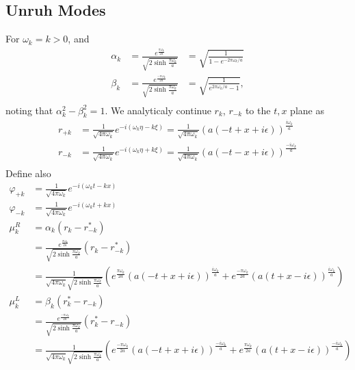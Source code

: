 \documentclass[12pt,a4paper]{article}
\begin{document}
\subsection{Unruh Modes}
For $\omega_k = k > 0$, and
\begin{equation}
  \begin{array}{lll}
    \alpha_k &= \frac{e^{\frac{\pi\omega_k}{2a}}}{\sqrt{2 \sinh \frac{\pi \omega_k}{a}}} &= \sqrt{\frac{1}{1 - e^{-2\pi\omega_k / a}}} \\
    \beta_k &= \frac{e^{\frac{-\pi\omega_k}{2a}}}{\sqrt{2 \sinh \frac{\pi \omega_k}{a}}} &= \sqrt{\frac{1}{e^{2\pi\omega_k / a} - 1}}, \\
  \end{array}
  \label{alpha_beta}
\end{equation}
noting that $\alpha_k^2 - \beta_k^2 = 1$. We analyticaly continue $r_k$, $r_{-k}$ to the $t,x$ plane as
\begin{equation}
  \begin{array}{ll}
    r_{+k} &= \frac{1}{\sqrt{4 \pi \omega_k}} e^{-i(\omega_k \eta - k \xi)} = \frac{1}{\sqrt{4 \pi \omega_k}} (a(-t + x + i \epsilon))^{\frac{i \omega_k}{a}} \\
    r_{-k} &= \frac{1}{\sqrt{4 \pi \omega_k}} e^{-i(\omega_k \eta + k \xi)} = \frac{1}{\sqrt{4 \pi \omega_k}} (a(-t - x + i \epsilon))^{\frac{-i \omega_k}{a}} \\
  \end{array}
\end{equation}
Define also
\begin{equation}
  \begin{array}{ll}
    \varphi_{+k} &= \frac{1}{\sqrt{4 \pi \omega_k}} e^{-i(\omega_k t - k x)}\\
    \varphi_{-k} &= \frac{1}{\sqrt{4 \pi \omega_k}} e^{-i(\omega_k t + k x)}\\
    \mu^R_k &= \alpha_k (r_k - r_{-k}^*) \\
    &= \frac{e^{\frac{\pi \omega_k}{2a}}}{\sqrt{2 \sinh \frac{\pi \omega_k}{a}}} \left(r_k - r_{-k}^* \right) \\
    &= \frac{1}{\sqrt{4 \pi \omega_k}\sqrt{2 \sinh \frac{\pi \omega_k}{a}}} \left( e^{\frac{\pi \omega_k}{2a}} \left(a(-t+x+i\epsilon)\right)^{\frac{i\omega_k}{a}} + e^{\frac{-\pi \omega_k}{2a}} \left(a(t+x-i\epsilon)\right)^{\frac{i\omega_k}{a}} \right) \\
    \mu^L_k &= \beta_k (r_k^* - r_{-k} )\\
    &=\frac{e^{\frac{-\pi \omega_k}{2a}}}{\sqrt{2 \sinh \frac{\pi \omega_k}{a}}} \left(r_k^* - r_{-k} \right) \\
    &=\frac{1}{\sqrt{4 \pi \omega_k}\sqrt{2 \sinh \frac{\pi \omega_k}{a}}} \left( e^{\frac{-\pi \omega_k}{2a}} \left(a(-t+x+i\epsilon)\right)^{\frac{-i\omega_k}{a}} + e^{\frac{\pi \omega_k}{2a}} \left(a(t+x-i\epsilon)\right)^{\frac{-i\omega_k}{a}} \right) \\
  \end{array}
\end{equation}
\end{document}
